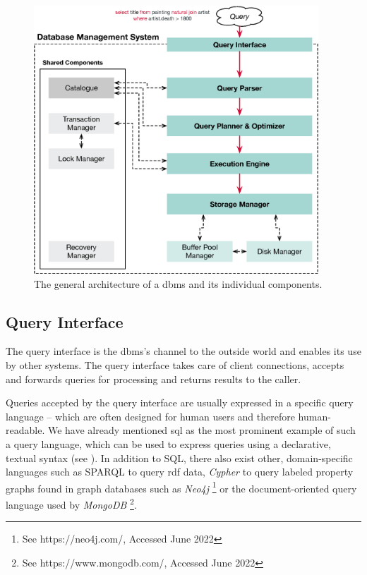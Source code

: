 \begin{figure}[tb]
    \centering
    \includegraphics[width=0.95\textwidth]{figures/dbms-architecture.eps}
    \caption{The general architecture of a \acrshort{dbms} and its individual components.}
    \label{figure:dbms-architecture}
\end{figure}

\subsection{Query Interface}

The query interface is the \acrshort{dbms}'s channel to the outside world and enables its use by other systems. The query interface takes care of client connections, accepts and forwards queries for processing and returns results to the caller.

Queries accepted by the query interface are usually expressed in a specific query language -- which are often designed for human users and therefore human-readable. We have already mentioned \acrshort{sql} \cite{XOpen:1996SQL,Chamberlin:2012Early} as the most prominent example of such a query language, which can be used to express queries using a declarative, textual syntax (see ). In addition to SQL, there also exist other, domain-specific languages such as SPARQL \cite{Perez:2009Semantics} to query \acrfull{rdf} data, \emph{Cypher} to query labeled property graphs \cite{Francis:2018Cypher} found in graph databases such as \emph{Neo4j} \footnote{See https://neo4j.com/, Accessed June 2022} or the document-oriented query language used by \emph{MongoDB} \footnote{See https://www.mongodb.com/, Accessed June 2022}.

